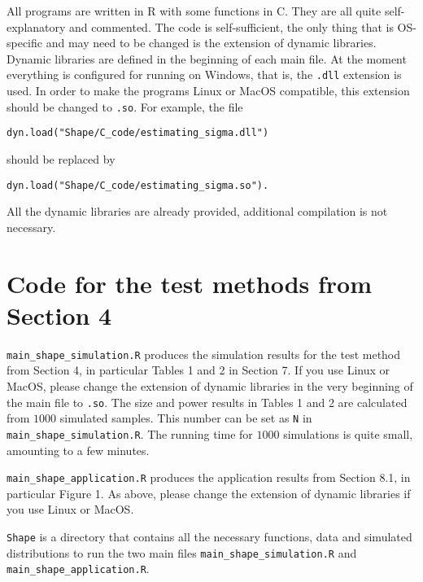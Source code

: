 \documentclass[a4paper,12pt]{article}
\begin{document}
All programs are written in R with some functions in C. They are all quite self-explanatory and commented. The code is self-sufficient, the only thing that is OS-specific and may need to be changed is the extension of dynamic libraries. Dynamic libraries are defined in the beginning of each main file. At the moment everything is configured for running on Windows, that is, the \verb|.dll| extension is used. In order to make the programs Linux or MacOS compatible, this extension should be changed to \verb|.so|. For example, the file
\begin{verbatim}
dyn.load("Shape/C_code/estimating_sigma.dll")
\end{verbatim} should be replaced by
\begin{verbatim}
dyn.load("Shape/C_code/estimating_sigma.so").
\end{verbatim}
All the dynamic libraries are already provided, additional  compilation is not necessary.



\newpage
\section*{Code for the test methods from Section 4}


\setlength{\parskip}{0.3cm}
\everypar{\hangafter=1\hangindent=1.45cm\relax}

\verb|main_shape_simulation.R| \hspace{1pt} produces the simulation results for the test method from Section 4, in particular Tables 1 and 2 in Section 7. If you use Linux or MacOS, please change the extension of dynamic libraries in the very beginning of the main file to \verb|.so|. The size and power results in Tables 1 and 2 are calculated from $1000$ simulated samples. This number can be set as \verb|N| in \verb|main_shape_simulation.R|. The running time for $1000$ simulations is quite small, amounting to a few minutes. 

\verb|main_shape_application.R| \hspace{1pt} produces the application results from Section 8.1, in particular Figure 1. As above, please change the extension of dynamic libraries if you use Linux or MacOS.

\verb|Shape| \hspace{1pt} is a directory that contains all the necessary functions, data and simulated distributions to run the two main files \verb|main_shape_simulation.R| and \verb|main_shape_application.R|.
\end{document}
